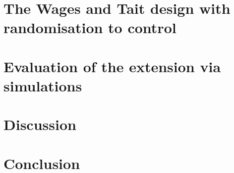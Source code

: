  \section{The Wages and Tait design with randomisation to control}
 \label{WT:Wages-and-Tait-design-RTC}
 
 \section{Evaluation of the extension via simulations}
 \label{WT:Evaluation-of-the-extension}
 
 \section{Discussion}
 \label{WT:Discussion}
 
 \section{Conclusion}
 \label{WT:Conclusion}